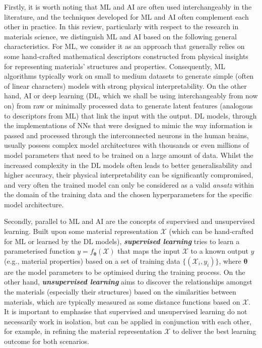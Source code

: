 Firstly, it is worth noting that ML and AI are often used interchangeably in the literature, and the techniques developed for ML and AI often complement each other in practice. In this review, particularly with respect to the research in materials science, we distinguish ML and AI based on the following general characteristics. For ML, we consider it as an approach that generally relies on some hand-crafted mathematical descriptors constructed from physical insights for representing materials' structures\cite{musil2021physics} and properties. Consequently, ML algorithms typically work on small to medium datasets to generate simple (often of linear characters) models with strong physical interpretability. On the other hand, AI or deep learning (DL, which we shall be using interchangeably from now on) from raw or minimally processed data to generate latent features (analogous to descriptors from ML) that link the input with the output.  DL models, through the implementations of NNs that were designed to mimic the way information is passed and processed through the interconnected neurons in the human brains,  usually possess complex model architectures with thousands or even millions of model parameters that need to be trained on a large amount of data. Whilst the increased complexity in the DL models often leads to better generalisability and higher accuracy, their physical interpretability can be significantly compromised, and very often the trained model can only be considered as a valid \emph{ansatz} within the domain of the training data and the chosen hyperparameters for the specific model architecture.   

Secondly, parallel to ML and AI are the concepts of supervised and unsupervised learning. Built upon some material representation $\mathcal{X}$ (which can be hand-crafted for ML or learned by the DL models), \textbf{\textit{supervised learning}} tries to learn a parameterised function $y=f_{\boldsymbol{\theta}}(\mathcal{X})$ that maps the input $\mathcal{X}$ to a known output $y$ (e.g., material properties) based on a set of training data $\{(\mathcal{X}_i, y_i)\}$, where $\boldsymbol{\theta}$ are the model parameters to be optimised during the training process. On the other hand, \textbf{\textit{unsupervised learning}} aims to discover the relationships amongst the materials (especially their structures) based on the similarities between materials, which are typically measured as some distance functions based on $\mathcal{X}$. It is important to emphasise that supervised and unsupervised learning do not necessarily work in isolation, but can be  applied in conjunction with each other, for example, in refining the material representation $\mathcal{X}$ to deliver the best learning outcome for both scenarios.\cite{helfrecht2020structure} 

